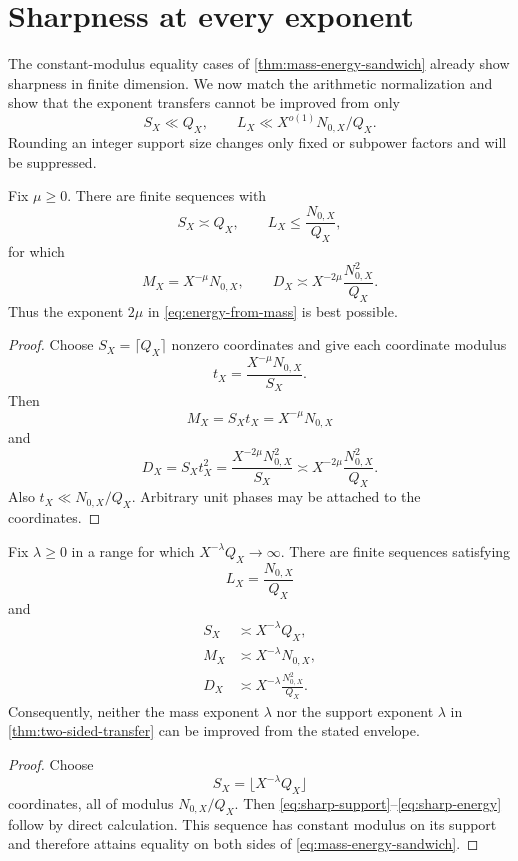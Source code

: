 \section{Sharpness at every exponent}
\label{sec:sharpness}

The constant-modulus equality cases of
\cref{thm:mass-energy-sandwich} already show sharpness in finite
dimension.  We now match the arithmetic normalization and show that
the exponent transfers cannot be improved from only
\[
 S_X\ll Q_X,\qquad
 L_X\ll X^{o(1)}N_{0,X}/Q_X.
\]
Rounding an integer support size changes only fixed or subpower
factors and will be suppressed.

\begin{proposition}
\label{prop:sharp-mass-energy}
Fix \(\mu\ge0\).  There are finite sequences with
\[
 S_X\asymp Q_X,\qquad
 L_X\le\frac{N_{0,X}}{Q_X},
\]
for which
\[
 M_X=X^{-\mu}N_{0,X},
\qquad
 D_X\asymp
 X^{-2\mu}\frac{N_{0,X}^2}{Q_X}.
\]
Thus the exponent \(2\mu\) in
\eqref{eq:energy-from-mass} is best possible.
\end{proposition}

\begin{proof}
Choose \(S_X=\lceil Q_X\rceil\) nonzero coordinates and give each
coordinate modulus
\[
 t_X=\frac{X^{-\mu}N_{0,X}}{S_X}.
\]
Then
\[
 M_X=S_Xt_X=X^{-\mu}N_{0,X}
\]
and
\[
 D_X=S_Xt_X^2
=\frac{X^{-2\mu}N_{0,X}^2}{S_X}
\asymp
X^{-2\mu}\frac{N_{0,X}^2}{Q_X}.
\]
Also \(t_X\ll N_{0,X}/Q_X\).  Arbitrary unit phases may be attached
to the coordinates.
\end{proof}

\begin{proposition}
\label{prop:sharp-energy-mass}
Fix \(\lambda\ge0\) in a range for which
\(X^{-\lambda}Q_X\to\infty\).  There are finite sequences satisfying
\[
 L_X=\frac{N_{0,X}}{Q_X}
\]
and
\begin{align}
 S_X&\asymp X^{-\lambda}Q_X,\label{eq:sharp-support}\\
 M_X&\asymp X^{-\lambda}N_{0,X},\label{eq:sharp-mass}\\
 D_X&\asymp
 X^{-\lambda}\frac{N_{0,X}^2}{Q_X}.
\label{eq:sharp-energy}
\end{align}
Consequently, neither the mass exponent \(\lambda\) nor the support
exponent \(\lambda\) in
\cref{thm:two-sided-transfer} can be improved from the stated
envelope.
\end{proposition}

\begin{proof}
Choose
\[
 S_X=\lfloor X^{-\lambda}Q_X\rfloor
\]
coordinates, all of modulus \(N_{0,X}/Q_X\).  Then
\eqref{eq:sharp-support}--\eqref{eq:sharp-energy} follow by direct
calculation.  This sequence has constant modulus on its support and
therefore attains equality on both sides of
\eqref{eq:mass-energy-sandwich}.
\end{proof}

